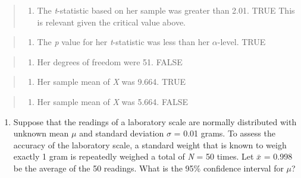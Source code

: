\documentclass[]{article}
\providecommand{\tightlist}{%
  \setlength{\itemsep}{0pt}\setlength{\parskip}{0pt}}
\begin{document}
\begin{quote}
\begin{enumerate}
\def\labelenumi{\alph{enumi}.}
\setcounter{enumi}{1}
\tightlist
\item
  The \emph{t}-statistic based on her sample was greater than 2.01. TRUE
  This is relevant given the critical value above.
\end{enumerate}
\end{quote}

\begin{quote}
\begin{enumerate}
\def\labelenumi{\alph{enumi}.}
\setcounter{enumi}{2}
\tightlist
\item
  The \emph{p} value for her \emph{t}-statistic was less than her
  \(\alpha\)-level. TRUE
\end{enumerate}
\end{quote}

\begin{quote}
\begin{enumerate}
\def\labelenumi{\alph{enumi}.}
\setcounter{enumi}{3}
\tightlist
\item
  Her degrees of freedom were 51. FALSE
\end{enumerate}
\end{quote}

\begin{quote}
\begin{enumerate}
\def\labelenumi{\alph{enumi}.}
\setcounter{enumi}{4}
\tightlist
\item
  Her sample mean of \emph{X} was 9.664. TRUE
\end{enumerate}
\end{quote}

\begin{quote}
\begin{enumerate}
\def\labelenumi{\alph{enumi}.}
\setcounter{enumi}{5}
\tightlist
\item
  Her sample mean of \emph{X} was 5.664. FALSE
\end{enumerate}
\end{quote}

\newpage

\begin{enumerate}
\def\labelenumi{\arabic{enumi}.}
\setcounter{enumi}{2}
\tightlist
\item
  Suppose that the readings of a laboratory scale are normally
  distributed with unknown mean \(\mu\) and standard deviation
  \(\sigma\) = 0.01 grams. To assess the accuracy of the laboratory
  scale, a standard weight that is known to weigh exactly 1 gram is
  repeatedly weighed a total of \emph{N} = 50 times. Let \(\bar{x}\) =
  0.998 be the average of the 50 readings. What is the 95\% confidence
  interval for \(\mu\)?
\end{enumerate}
\end{document}
